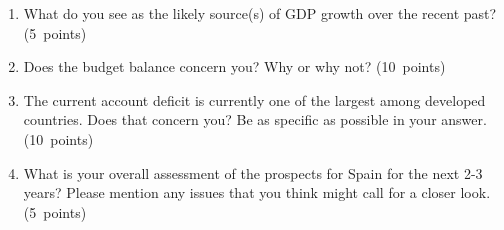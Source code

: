 \documentclass[letterpaper,12pt]{article}
\begin{document}
\begin{enumerate}
\begin{enumerate}

\item What do you see as the likely source(s) of GDP growth 
over the recent past?  
(5~points)

\item Does the budget balance concern you?  
Why or why not?  (10~points)

\item The current account deficit is currently one of the largest 
among developed countries.
Does that concern you?  Be as specific as possible in your answer. 
(10~points)

\item What is your overall assessment of the prospects for Spain
for the next 2-3 years?  
Please mention any issues that you think might call for a closer look. (5~points)

\end{enumerate}

\begin{comment}
Answer.
\begin{enumerate}
\item Lack of TFP growth is a concern.  
Growth must be coming from increases in $K$ and/or $L$.  
\item The government is running not only a primary surplus, 
but a total surplus, with the result that 
the debt-to-GDP ratio has fallen dramatically.  
You could formalize this with our debt dynamics relation, 
but the answer is clear.  
\item This is worth a closer look:  the deficit and net foreign assets
are both large.  
Are they getting worse?  
Consider the relation, 
\[
    \frac{\mbox{\em NFA}_{t}}{Y_{t}} \;=\; \left( \frac{1+i}{1+g} \right)
     \frac{\mbox{\em NFA}_{t-1}}{Y_{t-1}} 
     + \frac{\mbox{\em NX}_{t}}{Y_{t}} .
\]
We don't have net exports, but we can try the closely related current account.
With $ i = 2.8\%$ and $ g = 3.9 + 3.5 = 7.4\%$, 
the numbers tell us that next year's ratio of net foreign 
assets to GDP will fall to about:
\[
    (1.028/1.074) \times (-81.3) - 8.8 \;=\; -86.6 .
\]
In short, foreign borrowing is going up. 
(If we had NX data, the change would probably be less, because 
the current account includes interest payments.) 
The question is why. 
A deeper analysis would look into the kinds of borrowing 
(equity or debt?  firms or housing?) and its origins.  

\item Personally, I think they're good.  
However, lack of TFP growth is an obvious concern.  
Ditto the current account deficit, 
which could reflect either good or bad news, 
depending on the source. 


\end{comment}
\end{enumerate}
\end{document}

